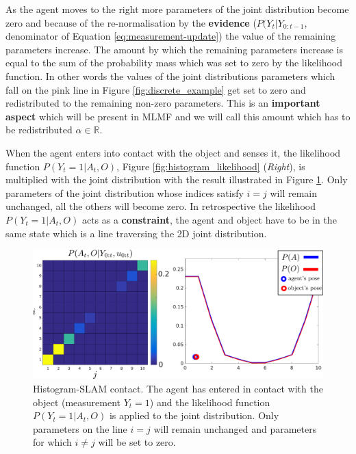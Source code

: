 As the agent moves to the right more parameters of the joint distribution become zero and because of the re-normalisation by the \textbf{evidence} ($P(Y_t|Y_{0:t-1}$, denominator of Equation \ref{eq:measurement-update}) the value of the remaining 
parameters increase. The amount by which the remaining parameters increase is equal to the sum of the probability mass which was set to zero by the likelihood function.
In other words the values of the joint distributions parameters which fall on the pink line in Figure \ref{fig:discrete_example} get set to zero and redistributed to the 
remaining non-zero parameters. This is an \textbf{important aspect} which will be present in MLMF and we will call this amount which has to be redistributed $\alpha \in \mathbb{R}$.

When the agent enters into contact with the object and senses it, the likelihood function $P(Y_t=1|A_t,O)$, Figure \ref{fig:histogram_likelihood} (\textit{Right}), is 
multiplied with the joint distribution with the result illustrated in Figure \ref{fig:discrete_example_contact}. Only parameters of the joint distribution whose indices
satisfy $i = j$ will remain unchanged, all the others will become zero. In retrospective the likelihood $P(Y_t=1|A_t,O)$ acts as a \textbf{constraint}, the agent and 
object have to be in the same state which is a line traversing the 2D joint distribution.

\begin{figure}
 \centering
 \includegraphics[width=\textwidth]{./ch5-MLMF/Figures/explenation/joint_marginal_contact.pdf}
 \caption{Histogram-SLAM contact. The agent has entered in contact with the object (measurement $Y_t = 1$) and the likelihood function $P(Y_t=1|A_t,O)$ is applied to the joint
 distribution. Only parameters on the line $i=j$ will remain unchanged and parameters for which $i \not= j$ will be set to zero.}
 \label{fig:discrete_example_contact}
\end{figure}

